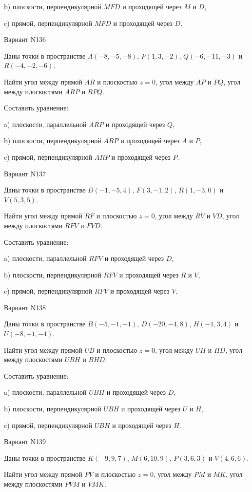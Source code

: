 \documentclass[11pt]{report}
\begin{document}
b) плоскости, перпендикулярной $MFD$ и проходящей через $M$ и $D$,

c) прямой, перпендикулярной $MFD$ и проходящей через $D$.

Вариант N136

Даны точки в пространстве
$A(-8, -5, -8)$, $P(1, 3, -2)$, $Q(-6, -11, -3)$ и
$R(-4, -2, -6)$.

Найти угол между прямой $AR$ и плоскостью $z = 0$, угол между $AP$ и $PQ$, угол между плоскостями $ARP$ 
и $RPQ$.

Составить уравнение: 

a) плоскости, параллельной $ARP$ и проходящей через $Q$,

b) плоскости, перпендикулярной $ARP$ и проходящей через $A$ и $P$,

c) прямой, перпендикулярной $ARP$ и проходящей через $P$.

Вариант N137

Даны точки в пространстве
$D(-1, -5, 4)$, $F(3, -1, 2)$, $R(1, -3, 0)$ и
$V(5, 3, 5)$.

Найти угол между прямой $RF$ и плоскостью $z = 0$, угол между $RV$ и $VD$, угол между плоскостями $RFV$ 
и $FVD$.

Составить уравнение: 

a) плоскости, параллельной $RFV$ и проходящей через $D$,

b) плоскости, перпендикулярной $RFV$ и проходящей через $R$ и $V$,

c) прямой, перпендикулярной $RFV$ и проходящей через $V$.

Вариант N138

Даны точки в пространстве
$B(-5, -1, -1)$, $D(-20, -4, 8)$, $H(-1, 3, 4)$ и
$U(-8, -1, -4)$.

Найти угол между прямой $UB$ и плоскостью $z = 0$, угол между $UH$ и $HD$, угол между плоскостями $UBH$ 
и $BHD$.

Составить уравнение: 

a) плоскости, параллельной $UBH$ и проходящей через $D$,

b) плоскости, перпендикулярной $UBH$ и проходящей через $U$ и $H$,

c) прямой, перпендикулярной $UBH$ и проходящей через $H$.

Вариант N139

Даны точки в пространстве
$K(-9, 9, 7)$, $M(6, 10, 9)$, $P(3, 6, 3)$ и
$V(4, 6, 6)$.

Найти угол между прямой $PV$ и плоскостью $z = 0$, угол между $PM$ и $MK$, угол между плоскостями $PVM$ 
и $VMK$.
\end{document}
